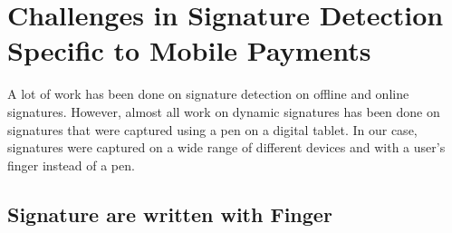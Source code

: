 \documentclass[a4paper, oneside]{csthesis}
\begin{document}










\section{Challenges in Signature Detection Specific to Mobile Payments}

A lot of work has been done on signature detection on offline and online signatures. However, almost all work on dynamic signatures has been done on signatures that were captured using a pen on a digital tablet. In our case, signatures were captured on a wide range of different devices and with a user's finger instead of a pen.


\subsection{Signature are written with Finger}
\end{document}

